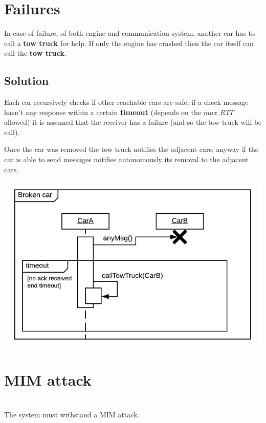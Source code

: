 \section{Failures}

In case of failure, of both engine and communication system,
another car has to call a \textbf{tow truck} for help. 
If only the engine has crashed then the car
itself can call the \textbf{tow truck}.


\subsection{Solution}

Each car recursively checks if other reachable cars are safe; if a check message
hasn't any response within a certain \textbf{timeout} (depends on the $max\_RTT$ allowed) 
it is assumed that the receiver has a failure (and so the tow truck will be call). 

Once the car was removed the tow truck notifies the adjacent cars; anyway if the car
is able to send messages notifies autonomously its removal to the adjacent cars.


\begin{center}
    \includegraphics[scale=0.9]{assets/ds2019_4.png}
\end{center}


\section{MIM attack}
\\

\noindent
The system must withstand a MIM attack.


